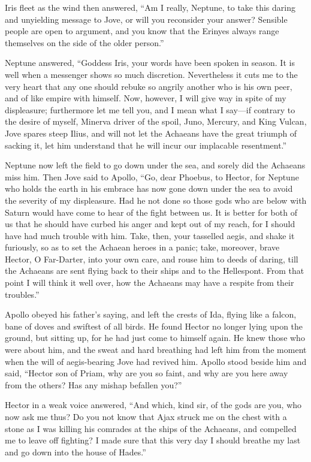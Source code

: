 Iris fleet as the wind then answered, “Am I really, Neptune, to take this
daring and unyielding message to Jove, or will you reconsider your answer?
Sensible people are open to argument, and you know that the Erinyes always
range themselves on the side of the older person.”

Neptune answered, “Goddess Iris, your words have been spoken in season. It
is well when a messenger shows so much discretion. Nevertheless it cuts me
to the very heart that any one should rebuke so angrily another who is his
own peer, and of like empire with himself. Now, however, I will give way
in spite of my displeasure; furthermore let me tell you, and I mean what I
say—if contrary to the desire of myself, Minerva driver of the
spoil, Juno, Mercury, and King Vulcan, Jove spares steep Ilius, and will
not let the Achaeans have the great triumph of sacking it, let him
understand that he will incur our implacable resentment.”

Neptune now left the field to go down under the sea, and sorely did the
Achaeans miss him. Then Jove said to Apollo, “Go, dear Phoebus, to Hector,
for Neptune who holds the earth in his embrace has now gone down under the
sea to avoid the severity of my displeasure. Had he not done so those gods
who are below with Saturn would have come to hear of the fight between us.
It is better for both of us that he should have curbed his anger and kept
out of my reach, for I should have had much trouble with him. Take, then,
your tasselled aegis, and shake it furiously, so as to set the Achaean
heroes in a panic; take, moreover, brave Hector, O Far-Darter, into your
own care, and rouse him to deeds of daring, till the Achaeans are sent
flying back to their ships and to the Hellespont. From that point I will
think it well over, how the Achaeans may have a respite from their
troubles.”

Apollo obeyed his father’s saying, and left the crests of Ida, flying like
a falcon, bane of doves and swiftest of all birds. He found Hector no
longer lying upon the ground, but sitting up, for he had just come to
himself again. He knew those who were about him, and the sweat and hard
breathing had left him from the moment when the will of aegis-bearing Jove
had revived him. Apollo stood beside him and said, “Hector son of Priam,
why are you so faint, and why are you here away from the others? Has any
mishap befallen you?”

Hector in a weak voice answered, “And which, kind sir, of the gods are
you, who now ask me thus? Do you not know that Ajax struck me on the chest
with a stone as I was killing his comrades at the ships of the Achaeans,
and compelled me to leave off fighting? I made sure that this very day I
should breathe my last and go down into the house of Hades.”

